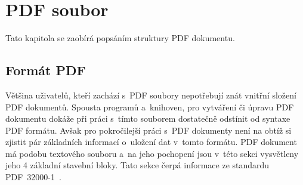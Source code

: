 







\chapter{PDF soubor} \label{PDF_file}
Tato kapitola se zaobírá popsáním struktury PDF dokumentu. 

\dummyText



\section{Formát PDF} \label{format_PDF}
Většina uživatelů, kteří zachází s~PDF soubory nepotřebují znát vnitřní složení
PDF dokumentů. Spousta programů a~knihoven, pro vytváření či úpravu PDF dokumentu
dokáže při práci s~tímto souborem dostatečně odstínit od syntaxe PDF formátu.
Avšak pro pokročilejší práci s~PDF dokumenty není na obtíž si zjistit pár
základních informací o~uložení dat v~tomto formátu.
PDF dokument má podobu textového souboru a~na jeho pochopení jsou v~této sekci
vysvětleny jeho 4 základní stavební bloky. Tato sekce čerpá informace ze
standardu PDF~32000-1~\cite{PDF32000-1:2008}.


